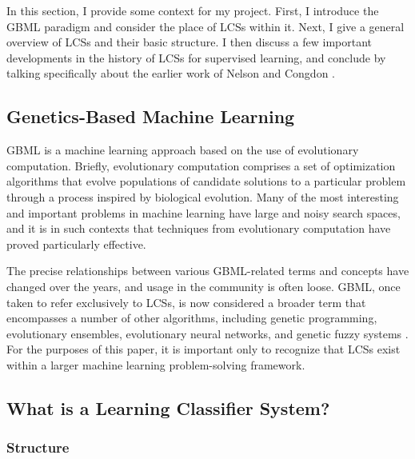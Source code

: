 \documentclass[11pt]{article}
\begin{document}
In this section, I provide some context for my project. First, I introduce the GBML paradigm and consider the place of LCSs within it. Next, I give a general overview of LCSs and their basic structure. I then discuss a few important developments in the history of LCSs for supervised learning, and conclude by talking specifically about the earlier work of Nelson and Congdon \cite{nelson_measuring_2016}.

\subsection{Genetics-Based Machine Learning}

GBML is a machine learning approach based on the use of evolutionary computation. Briefly, evolutionary computation comprises a set of optimization algorithms that evolve populations of candidate solutions to a particular problem through a process inspired by biological evolution. Many of the most interesting and important problems in machine learning have large and noisy search spaces, and it is in such contexts that techniques from evolutionary computation have proved particularly effective.

The precise relationships between various GBML-related terms and concepts have changed over the years, and usage in the community is often loose. GBML, once taken to refer exclusively to LCSs, is now considered a broader term that encompasses a number of other algorithms, including genetic programming, evolutionary ensembles, evolutionary neural networks, and genetic fuzzy systems \cite{kovacs_genetics-based_2012}. For the purposes of this paper, it is important only to recognize that LCSs exist within a larger machine learning problem-solving framework.

\subsection{What is a Learning Classifier System?}

\subsubsection{Structure}
\end{document}
